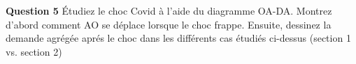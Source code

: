 \documentclass[11pt,a4paper]{article}
\begin{document}
\bigskip 


\textbf{Question  5}  \'{E}tudiez le choc Covid \`{a} l'aide du diagramme OA-DA. Montrez d'abord comment AO se d\'{e}place lorsque le choc frappe. Ensuite, dessinez la demande agr\'{e}g\'{e}e apr\'{e}s le choc dans les diff\'{e}rents cas \'{e}tudi\'{e}s ci-dessus (section 1 vs. section 2)


\end{document}
